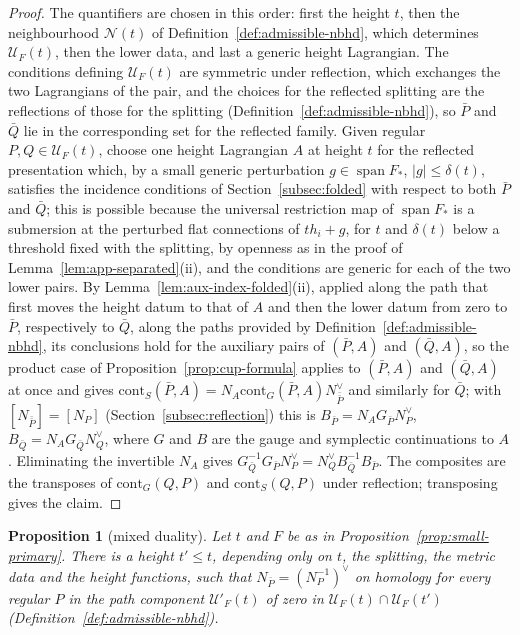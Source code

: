 \documentclass[11pt]{amsart}
\newtheorem{proposition}[theorem]{Proposition}
\theoremstyle{definition}
\theoremstyle{remark}
\theoremstyle{plain}
\numberwithin{equation}{section}
\begin{document}
\begin{proof}
The quantifiers are chosen in this order: first the height $t$, then the neighbourhood
$\mathcal N(t)$ of Definition~\ref{def:admissible-nbhd}, which determines $\mathcal U_F(t)$,
then the lower data, and last a generic height Lagrangian. The conditions defining
$\mathcal U_F(t)$ are symmetric under reflection, which exchanges the two Lagrangians of the
pair, and the choices for the reflected splitting are the reflections of those for the
splitting (Definition~\ref{def:admissible-nbhd}), so $\bar P$ and $\bar Q$ lie in the
corresponding set for the reflected family. Given
regular $P,Q\in\mathcal U_F(t)$, choose one height Lagrangian $A$ at height $t$ for the
reflected presentation which, by a small generic perturbation $g\in\operatorname{span}F_*$,
$|g|\le\delta(t)$, satisfies the incidence conditions of
Section~\ref{subsec:folded} with respect to both $\bar P$ and $\bar Q$; this is
possible because the universal restriction map of $\operatorname{span}F_*$ is a
submersion at the perturbed flat connections of $th_i+g$, for $t$ and $\delta(t)$ below a
threshold fixed with the splitting, by openness as in the proof of
Lemma~\ref{lem:app-separated}(ii), and the conditions are generic for each of the two lower
pairs. By
Lemma~\ref{lem:aux-index-folded}(ii), applied along the path that first moves the height datum
to that of $A$ and then the lower datum from zero to $\bar P$, respectively to $\bar Q$, along
the paths provided by Definition~\ref{def:admissible-nbhd}, its conclusions hold for the
auxiliary pairs of $(\bar P,A)$ and $(\bar Q,A)$, so the product case of
Proposition~\ref{prop:cup-formula} applies to $(\bar P,A)$ and $(\bar Q,A)$ at once and gives
$\mathrm{cont}_S(\bar P,A)=N_A\mathrm{cont}_G(\bar P,A)N_{\bar{\bar P}}^\vee$ and similarly for $\bar Q$;
with $[N_{\bar{\bar P}}]=[N_P]$ (Section~\ref{subsec:reflection}) this is
$B_{\bar P}=N_AG_{\bar P}N_P^\vee$, $B_{\bar Q}=N_AG_{\bar Q}N_Q^\vee$, where $G$ and $B$
are the gauge and symplectic continuations to $A$. Eliminating the invertible
$N_A$ gives $G_{\bar Q}^{-1}G_{\bar P}N_P^\vee=N_Q^\vee B_{\bar Q}^{-1}B_{\bar P}$. The
composites are the transposes of $\mathrm{cont}_G(Q,P)$ and $\mathrm{cont}_S(Q,P)$ under reflection;
transposing gives the claim.
\end{proof}

\begin{proposition}[mixed duality]\label{prop:duality}
Let $t$ and $F$ be as in Proposition~\ref{prop:small-primary}. There is a height $t'\le t$,
depending only on $t$, the splitting, the metric data and the height functions, such that
$N_{\bar P}=(N_P^{-1})^\vee$ on homology for every regular $P$ in the path component
$\mathcal U'_F(t)$ of zero in $\mathcal U_F(t)\cap\mathcal U_F(t')$
(Definition~\ref{def:admissible-nbhd}).
\end{proposition}
\end{document}
